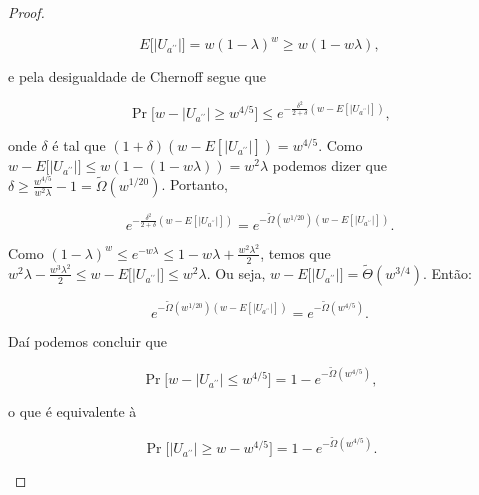 \begin{proof}
\begin{enumerate}
	\begin{equation*}
		E \big[\lvert U_{a^{\prime \prime}} \rvert \big] = w(1 - \lambda)^{w} \geq w(1 - w\lambda),
	\end{equation*}
	
	e pela desigualdade de Chernoff segue que
	
	\begin{equation*}
		\Pr \big[ w - \lvert U_{a^{\prime \prime}} \rvert \geq w^{4/5} \big] \leq e^{-\frac{\delta^{2}}{2 + \delta}(w - E[ \lvert U_{a^{\prime \prime}} \rvert ])},
	\end{equation*}
	
	onde $\delta$ é tal que $(1 + \delta)(w - E[ \lvert U_{a^{\prime \prime}} \rvert ]) = w^{4/5}$. Como $w - E \big[ \lvert U_{a^{\prime \prime}} \rvert \big] \leq w(1 - (1 - w\lambda)) = w^{2}\lambda$ podemos dizer que $\delta \geq \frac{w^{4/5}}{w^{2}\lambda} - 1 = \widetilde{\Omega}(w^{1/20})$. Portanto,
	
	\begin{equation*}
		 e^{-\frac{\delta^{2}}{2 + \delta}(w - E[\lvert U_{a^{\prime \prime}} \rvert])} = e^{-\widetilde{\Omega}(w^{1/20})(w - E[ \lvert U_{a^{\prime \prime}}\rvert])}.
	\end{equation*}
	
	Como $(1 - \lambda)^{w} \leq e^{-w\lambda} \leq 1 - w\lambda + \frac{w^{2}\lambda^{2}}{2}$, temos que $w^{2}\lambda - \frac{w^{3}\lambda^{2}}{2} \leq w - E \big[ \lvert U_{a^{\prime \prime}} \rvert \big] \leq w^{2}\lambda$. Ou seja, $w - E \big[ \lvert U_{a^{\prime \prime}} \rvert \big] = \widetilde{\Theta}(w^{3/4})$. Então:
	
	\begin{equation*}
		e^{-\widetilde{\Omega}(w^{1/20})(w - E[ \lvert U_{a^{\prime \prime}}\rvert])} = e^{-\widetilde{\Omega}(w^{4/5})}.
	\end{equation*}
	
	Daí podemos concluir que
	
	\begin{equation*}
		\Pr \big[ w - \lvert U_{a^{\prime \prime}} \rvert \leq w^{4/5} \big] = 1 - e^{-\widetilde{\Omega}(w^{4/5})},
	\end{equation*}
	
	o que é equivalente à
	
	\begin{equation*}
		\Pr \big[ \lvert U_{a^{\prime \prime}} \rvert \geq w - w^{4/5} \big] = 1 - e^{-\widetilde{\Omega}(w^{4/5})}.
	\end{equation*}
	
\end{enumerate}

\end{proof}

